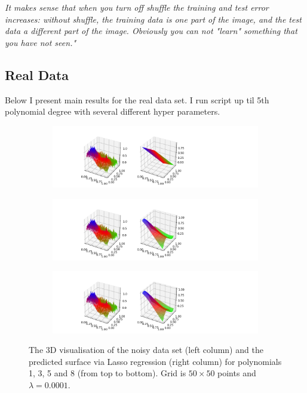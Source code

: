 \textit{It makes sense that when you turn off shuffle the training and test error increases: without shuffle, the training data is one part of the image, and the test data a different part of the image. Obviously you can not "learn" something that you have not seen."}




 \subsection{Real Data}
 
 Below I present main results for the real data set. I run script up til 5th polynomial degree with several different hyper parameters.
 
 \begin{figure}[!ht]
\begin{subfigure}{\textwidth}
  \centering
  \includegraphics[width=1.2\linewidth]{images/surf/fake_lasso_p01_n50.png}
\end{subfigure}
\begin{subfigure}{\textwidth}
  \centering
  \includegraphics[width=1.2\linewidth]{images/surf/fake_lasso_p03_n50.png}
\end{subfigure}
\begin{subfigure}{\textwidth}
  \centering
  \includegraphics[width=1.2\linewidth]{images/surf/fake_lasso_p05_n50.png}
\end{subfigure}
\caption{The 3D visualisation of the noisy data set (left column) and the predicted surface via Lasso regression (right column) for polynomials 1, 3, 5 and 8 (from top to bottom). Grid is $50\times50$ points and $\lambda = 0.0001$.}
\label{fig:lasso-surf}
\end{figure}
 
